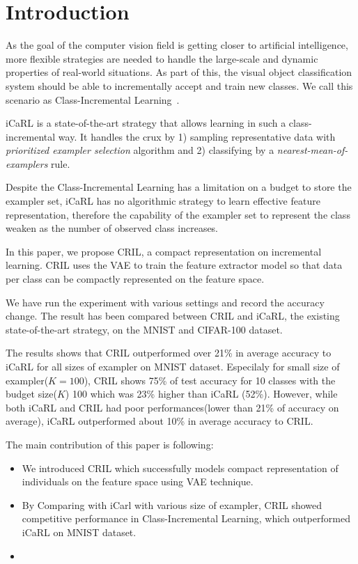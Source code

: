 \section{Introduction}
\label{sec:introduction}

As the goal of the computer vision field is getting closer to artificial intelligence, more flexible strategies are needed to handle the large-scale and dynamic properties of real-world situations. As part of this, the visual object classification system should be able to incrementally accept and train new classes. We call this scenario as Class-Incremental Learning~\cite{Rebuffi:2016aa}.

iCaRL is a state-of-the-art strategy that allows learning in such a class-incremental way. It handles the crux by 1) sampling representative data with \textit{prioritized exampler selection} algorithm and 2) classifying by a \textit{nearest-mean-of-examplers} rule.

Despite the Class-Incremental Learning has a limitation on a budget to store the exampler set, iCaRL has no algorithmic strategy to learn effective feature representation, therefore the capability of the exampler set to represent the class weaken as the number of observed class increases.

In this paper, we propose CRIL, a compact representation on incremental learning. CRIL uses the VAE to train the feature extractor model so that data per class can be compactly represented on the feature space.

We have run the experiment with various settings and record the accuracy change. The result has been compared between CRIL and iCaRL, the existing state-of-the-art strategy, on the MNIST and CIFAR-100 dataset.

The results shows that CRIL outperformed over 21\% in average accuracy to iCaRL for all sizes of exampler on MNIST dataset. Especilaly for small size of exampler($K=100$), CRIL shows 75\% of test accuracy for 10 classes with the budget size($K$) 100 which was 23\% higher than iCaRL (52\%). However, while both iCaRL and CRIL had poor performances(lower than 21\% of accuracy on average), iCaRL outperformed about 10\% in average accuracy to CRIL.

The main contribution of this paper is following:
\begin{itemize}
\item We introduced CRIL which successfully models compact representation of individuals on the feature space using VAE technique.
\item By Comparing with iCarl with various size of exampler, CRIL showed competitive performance in Class-Incremental Learning, which outperformed iCaRL on MNIST dataset.
\item {}
\end{itemize}
